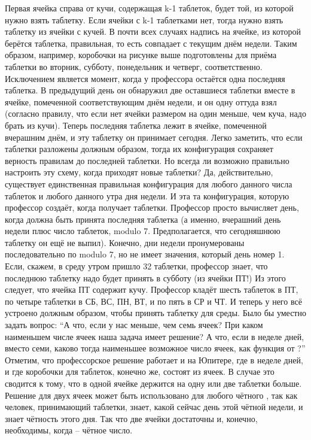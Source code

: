  Первая ячейка справа от кучи, содержащая k-1 таблеток, будет той, из которой нужно взять таблетку. Если ячейки с  k-1 таблетками нет, тогда нужно взять таблетку из ячейки с кучей. В почти всех случаях надпись на ячейке, из которой берётся таблетка, правильная, то есть совпадает с текущим днём недели.
  Таким образом, например, коробочки на рисунке выше подготовлены для приёма таблетки во вторник, субботу, понедельник и четверг, соответственно.
  Исключением является момент, когда у профессора остаётся одна последняя таблетка. В предыдущий день он обнаружил две оставшиеся таблетки вместе в ячейке, помеченной соответствующим днём недели, и он одну оттуда взял (согласно правилу, что если нет ячейки размером на один меньше, чем куча, надо брать из кучи). Теперь последняя таблетка лежит в ячейке, помеченной вчерашним днём, и эту таблетку он принимает сегодня.
   Легко заметить, что если таблетки разложены должным образом, тогда их конфигурация сохраняет верность правилам  до последней таблетки. Но всегда ли возможно правильно настроить эту схему, когда приходят новые таблетки? Да, действительно, существует единственная правильная конфигурация для любого данного числа таблеток и любого данного утра дня недели. И эта та конфигурация, которую профессор создаёт, когда получает таблетки. Профессор просто вычисляет день, когда должна быть принята последняя таблетка (а именно, вчерашний день недели плюс число таблеток, modulo 7.
Предполагается, что сегодняшнюю  таблетку он ещё не выпил). Конечно, дни недели пронумерованы последовательно по modulo 7, но не имеет значения, который день номер 1. 
  Если, скажем, в среду утром пришло 32 таблетки, профессор знает, что последнюю таблетку надо будет принять в субботу (из ячейки ПТ!) Из этого следует, что ячейка ПТ содержит кучу. Профессор кладёт шесть таблеток в ПТ, по четыре таблетки в СБ, ВС, ПН, ВТ, и по пять в СР и ЧТ. И теперь у него всё устроено должным образом, чтобы принять таблетку для среды.
  Было бы уместно задать вопрос: “А что, если у нас меньше, чем семь ячеек? При каком наименьшем числе ячеек наша задача имеет решение? А что, если в неделе  дней, вместо семи,  каково тогда наименьшее возможное число ячеек, как функция от ?”
   Отметим, что профессорское решение работает и на Юпитере, где в неделе дней, и где коробочки для таблеток, конечно же, состоят из ячеек. В случае это сводится к тому, что в одной ячейке держится на одну или две таблетки больше.
  Решение для двух ячеек может быть использовано для любого чётного , так как человек, принимающий таблетки, знает, какой сейчас день этой чётной недели, и знает чётность этого дня. Так что две ячейки достаточны и, конечно, необходимы, когда -- чётное число.
